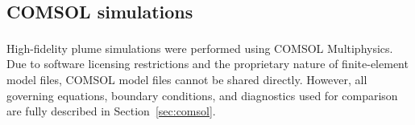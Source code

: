 \documentclass[11pt]{article}
\begin{document}
\subsection{COMSOL simulations}

High-fidelity plume simulations were performed using COMSOL
Multiphysics\textsuperscript{\textregistered}. Due to software licensing restrictions
and the proprietary nature of finite-element model files, COMSOL model files cannot be
shared directly. However, all governing equations, boundary conditions, and diagnostics
used for comparison are fully described in Section~\ref{sec:comsol}.


\label{sec:references}
\end{document}
